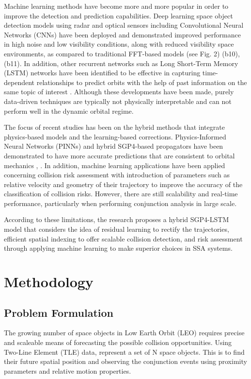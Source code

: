 \documentclass{ieeeaccess}
\begin{document}
Machine learning methods have become more and more popular in order to improve the detection and prediction capabilities. Deep learning space object detection models using radar and optical sensors including Convolutional Neural Networks (CNNs) have been deployed and demonstrated improved performance in high noise and low visibility conditions, along with reduced visibility space environments, as compared to traditional FFT-based models (see Fig. 2) (b10), (b11). In addition, other recurrent networks such as Long Short-Term Memory (LSTM) networks have been identified to be effective in capturing time-dependent relationships to predict orbits with the help of past information on the same topic of interest \cite{b7}. Although these developments have been made, purely data-driven techniques are typically not physically interpretable and can not perform well in the dynamic orbital regime.

The focus of recent studies has been on the hybrid methods that integrate physics-based models and the learning-based corrections. Physics-Informed Neural Networks (PINNs) and hybrid SGP4-based propagators have been demonstrated to have more accurate predictions that are consistent to orbital mechanics \cite{b18}, \cite{b1}. In addition, machine learning applications have been applied concerning collision risk assessment with introduction of parameters such as relative velocity and geometry of their trajectory to improve the accuracy of the classification of collision risks. However, there are still scalability and real-time performance, particularly when performing conjunction analysis in large scale.

According to these limitations, the research proposes a hybrid SGP4-LSTM model that considers the idea of residual learning to rectify the trajectories, efficient spatial indexing to offer scalable collision detection, and risk assessment through applying machine learning to make superior choices in SSA systems.

\section{Methodology}
\subsection{Problem Formulation}
The growing number of space objects in Low Earth Orbit (LEO) requires precise and scaleable means of forecasting the possible collision opportunities. Using Two-Line Element (TLE) data, represent a set of N space objects. This is to find their future spatial position and observing the conjunction events using proximity parameters and relative motion properties.
\end{document}
